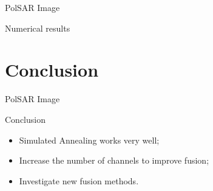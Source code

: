 \documentclass[10pt]{beamer}
\begin{document}
\begin{frame}[fragile]{PolSAR Image}
\begin{alertblock}{Numerical results}
	\begin{figure}[hbt]
	\centering
     \label{evidencias_hh_hv_vv}
   \end{figure}	
\end{alertblock}
\end{frame}

\section{Conclusion}
\begin{frame}[fragile]{PolSAR Image}
\begin{alertblock}{Conclusion}
\begin{itemize}
	\item Simulated Annealing works very well;
	\item Increase the number of channels to improve fusion;
	\item Investigate new fusion methods.
\end{itemize}
\end{alertblock}
\end{frame}

\begin{frame}[allowframebreaks]


\end{frame}
\end{document}
